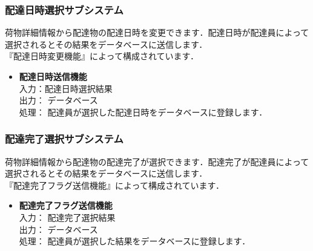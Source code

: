 \documentclass[a4j,titlepage]{jarticle}
\begin{document}
\subsubsection{配達日時選択サブシステム}
荷物詳細情報から配達物の配達日時を変更できます．配達日時が配達員によって選択されるとその結果をデータベースに送信します．\\
『配達日時変更機能』によって構成されています．
\begin{itemize}
\item \textbf{配達日時送信機能} \\
入力：配達日時選択結果 \\
出力： データベース \\
処理： 配達員が選択した配達日時をデータベースに登録します．
\end{itemize}

\subsubsection{配達完了選択サブシステム}
荷物詳細情報から配達物の配達完了が選択できます．配達完了が配達員によって選択されるとその結果をデータベースに送信します．\\
『配達完了フラグ送信機能』によって構成されています．
\begin{itemize}
\item \textbf{配達完了フラグ送信機能} \\
入力： 配達完了選択結果\\
出力： データベース \\
処理： 配達員が選択した結果をデータベースに登録します．
\end{itemize}
\end{document}
